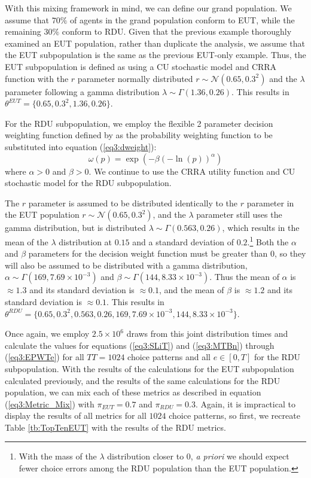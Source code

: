 \documentclass[../main.tex]{subfiles}
\begin{document}
With this mixing framework in mind, we can define our grand population.
We assume that $70\%$ of agents in the grand population conform to EUT, while the remaining $30\%$ conform to RDU.
Given that the previous example thoroughly examined an EUT population, rather than duplicate the analysis, we assume that the EUT subpopulation is the same as the previous EUT-only example.
Thus, the EUT subpopulation is defined as using a CU stochastic model and CRRA function with the $r$ parameter normally distributed $r \sim \mathcal{N}(0.65 , 0.3^2 )$ and the $\lambda$ parameter following a gamma distribution $\lambda \sim \Gamma(1.36 , 0.26)$.
This results in $\theta^{EUT} = \lbrace 0.65 ,0.3^2, 1.36 , 0.26\rbrace$.

For the RDU subpopulation, we employ the flexible 2 parameter decision weighting function defined by \textcite{Prelec1998} as the probability weighting function to be substituted into equation (\ref{eq3:dweight}):
\begin{equation}
	\label{eq3:pw:pre}
	\omega(p)=\exp(-\beta(-\ln(p))^\alpha)
\end{equation}
\noindent where $\alpha > 0$ and $\beta > 0$.
We continue to use the CRRA utility function and CU stochastic model for the RDU subpopulation.

The $r$ parameter is assumed to be distributed identically to the $r$ parameter in the EUT population $r \sim \mathcal{N}(0.65 , 0.3^2 )$, and the $\lambda$ parameter still uses the gamma distribution, but is distributed $\lambda \sim \Gamma(0.563 , 0.26)$, which results in the mean of the $\lambda$ distribution at $0.15$ and a standard deviation of $0.2$.\footnote{
	With the mass of the $\lambda$ distribution closer to $0$, \textit{a priori} we should expect fewer choice errors among the RDU population than the EUT population.
}
Both the $\alpha$ and $\beta$ parameters for the decision weight function must be greater than $0$, so they will also be assumed to be distributed with a gamma distribution, $\alpha \sim \Gamma(169 , 7.69 \times 10^{-3})$ and $\beta \sim \Gamma(144 , 8.33 \times 10^{-3})$.
Thus the mean of $\alpha$ is $\approx 1.3$ and its standard deviation is $\approx 0.1$, and the mean of $\beta$ is $\approx 1.2$ and its standard deviation is $\approx 0.1$.
This results in $\theta^{RDU} = \lbrace  0.65 ,0.3^2,  0.563 , 0.26 , 169 , 7.69 \times 10^{-3} , 144 , 8.33 \times 10^{-3} \rbrace$.

Once again, we employ $2.5 \times 10^6$ draws from this joint distribution times and calculate the values for equations (\ref{eq3:SLiT}) and (\ref{eq3:MTBn}) through (\ref{eq3:EPWTe}) for all $\mathit{TT} =1024$ choice patterns and all $e \in[0,T]$ for the RDU subpopulation.
With the results of the calculations for the EUT subpopulation calculated previously, and the results of the same calculations for the RDU population, we can mix each of these metrics as described in equation (\ref{eq3:Metric_Mix}) with $\pi_{EUT} = 0.7$ and $\pi_{RDU} = 0.3$.
Again, it is impractical to display the results of all metrics for all $1024$ choice patterns, so first, we recreate Table \ref{tb:TopTenEUT} with the results of the RDU metrics.
\end{document}
